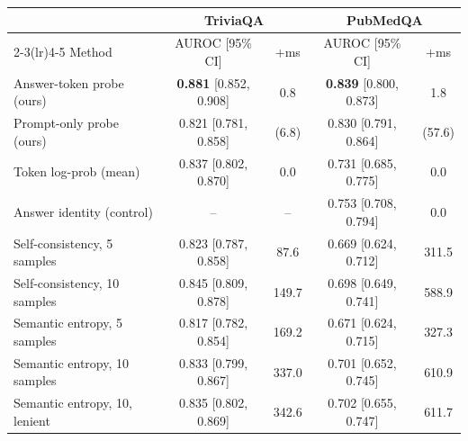 \begin{tabular}{lcccc}
\toprule
 & \multicolumn{2}{c}{TriviaQA} & \multicolumn{2}{c}{PubMedQA} \\
\cmidrule(lr){2-3}\cmidrule(lr){4-5}
Method & AUROC [95\% CI] & +ms & AUROC [95\% CI] & +ms \\
\midrule
Answer-token probe (ours) & \textbf{0.881} [0.852, 0.908] & 0.8 & \textbf{0.839} [0.800, 0.873] & 1.8 \\
Prompt-only probe (ours) & 0.821 [0.781, 0.858] & (6.8) & 0.830 [0.791, 0.864] & (57.6) \\
Token log-prob (mean) & 0.837 [0.802, 0.870] & 0.0 & 0.731 [0.685, 0.775] & 0.0 \\
Answer identity (control) & -- & -- & 0.753 [0.708, 0.794] & 0.0 \\
\midrule
Self-consistency, 5 samples & 0.823 [0.787, 0.858] & 87.6 & 0.669 [0.624, 0.712] & 311.5 \\
Self-consistency, 10 samples & 0.845 [0.809, 0.878] & 149.7 & 0.698 [0.649, 0.741] & 588.9 \\
Semantic entropy, 5 samples & 0.817 [0.782, 0.854] & 169.2 & 0.671 [0.624, 0.715] & 327.3 \\
Semantic entropy, 10 samples & 0.833 [0.799, 0.867] & 337.0 & 0.701 [0.652, 0.745] & 610.9 \\
Semantic entropy, 10, lenient & 0.835 [0.802, 0.869] & 342.6 & 0.702 [0.655, 0.747] & 611.7 \\
\bottomrule
\end{tabular}
